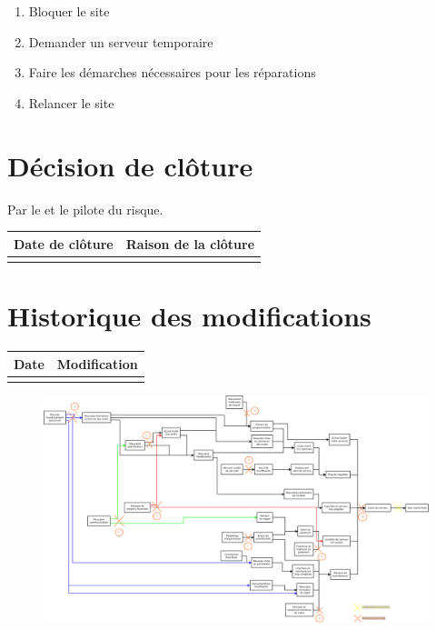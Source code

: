 \begin{enumerate}
	\item Bloquer le site
	\item Demander un serveur temporaire
	\item Faire les démarches nécessaires pour les réparations
	\item Relancer le site
\end{enumerate}

\section*{Décision de clôture}
Par le \CP{} et le pilote du risque.
\begin{table}[H]
\centering
	\begin{tabularx}{16.8cm}{|X|X|}
	\hline
	\rowcolor{gray!40} Date de clôture & Raison de la clôture \\
	\hline
	  & \\
	\hline
	\end{tabularx}
\end{table}

\section*{Historique des modifications}
\begin{table}[H]
\centering
	\begin{tabularx}{16.8cm}{|X|X|}
	\hline
	Date & Modification \\
	\hline
	  & \\
	\hline
	\end{tabularx}
\end{table}
\newpage

\begin{landscape}
\begin{figure}
	\centering
	\includegraphics[scale=0.35]{images/AnalyseRisque_nPourquoi.png}
\end{figure}
\end{landscape}